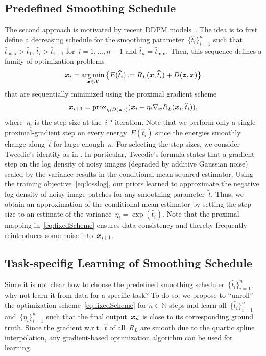 \documentclass{article} %
\theoremstyle{plain}
\theoremstyle{definition}
\theoremstyle{remark}
\newcommand{\N}{\mathbb{N}}
\newcommand{\X}{\mathcal{X}}
\newcommand{\prox}{\mathrm{prox}}
\def\hatt{{\widehat{t}}}
\newcommand{\tminh}{\hatt_\mathrm{min}}
\newcommand{\tmaxh}{\hatt_\mathrm{max}}
\begin{document}
\subsection{Predefined Smoothing Schedule} \label{sec:predefinedSchedule}
The second approach is motivated by recent DDPM models~\citep{SoEr19,HoJa20}.
The idea is to first define a decreasing schedule for the smoothing parameter~$\{\widehat{t}_i\}_{i=1}^n$ such that~$\tmaxh>\widehat{t}_1$, $\widehat{t}_i>\widehat{t}_{i+1}$ for~$i=1,\ldots,n-1$ and $\widehat{t}_n=\tminh$.
Then, this sequence defines a family of optimization problems
\[
\vx_i =\argmin_{\vx\in\X} \left\{E(\widehat{t}_i)\coloneqq R_L(\vx,\widehat{t}_i)+D(\vz,\vx)\right\}
\]
that are sequentially minimized using the proximal gradient scheme~\citep{Be17}
\begin{align} \label{eq:fixedScheme}
\vx_{i+1} = \prox_{\eta_iD(\vz,\cdot)}(\vx_i-\eta_i\nabla_\vx R_L(\vx_i,\widehat{t}_i)),
\end{align}
where~$\eta_i$ is the step size at the~$i^\text{th}$ iteration.
Note that we perform only a single proximal-gradient step on every energy~$E(\widehat{t}_i)$ since the energies smoothly change along~$\widehat{t}$ for large enough~$n$.
For selecting the step sizes, we consider Tweedie's identity as in .
In particular, Tweedie's formula states that a gradient step on the log density of noisy images (degraded by additive Gaussian noise) scaled by the variance results in the conditional mean squared estimator.
Using the training objective~\eqref{eq:losslog}, our priors learned to approximate the negative log-density of noisy image patches for any smoothing parameter~$\widetilde{t}$.
Thus, we obtain an approximation of the conditional mean estimator by setting the step size to an estimate of the variance~$\eta_i=\exp(\widehat{t}_i)$.
Note that the proximal mapping in~\eqref{eq:fixedScheme} ensures data consistency and thereby frequently reintroduces some noise into~${\bm{x}}_{i+1}$.

\subsection{Task-specifig Learning of Smoothing Schedule} \label{sec:learnedVN}
Since it is not clear how to choose the predefined smoothing scheduler~$\{\widehat{t}_i\}_{i=1}^n$, why not learn it from data for a specific task?
To do so, we propose to ``unroll'' the optimization scheme~\eqref{eq:fixedScheme} for $n\in\N$ steps and learn all~$\{\hatt_i\}_{i=1}^n$ and~$\{\eta_i\}_{i=1}^n$ such that the final output~${\bm{x}}_n$ is close to its corresponding ground truth.
Since the gradient w.r.t.~$\hatt$ of all~$R_L$ are smooth due to the quartic spline interpolation, any gradient-based optimization algorithm can be used for learning.
\end{document}
